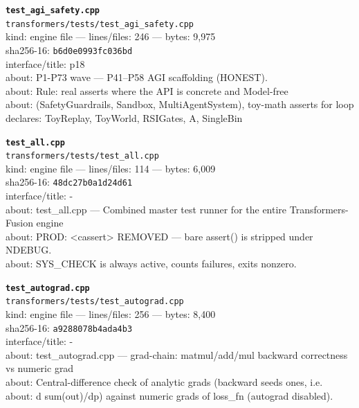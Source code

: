 \noindent\textbf{\texttt{test\_agi\_safety.cpp}}\\
\texttt{transformers/tests/test\_agi\_safety.cpp}\\
kind: engine file --- lines/files: 246 --- bytes: 9,975\\
sha256-16: \texttt{b6d0e0993fc036bd}\\
interface/title: p18\\
about: P1-P73 wave — P41–P58 AGI scaffolding (HONEST).\\
about: Rule: real asserts where the API is concrete and Model-free\\
about: (SafetyGuardrails, Sandbox, MultiAgentSystem), toy-math asserts for loop\\
declares: ToyReplay, ToyWorld, RSIGates, A, SingleBin\\
\vspace*{6.0pt}

\noindent\textbf{\texttt{test\_all.cpp}}\\
\texttt{transformers/tests/test\_all.cpp}\\
kind: engine file --- lines/files: 114 --- bytes: 6,009\\
sha256-16: \texttt{48dc27b0a1d24d61}\\
interface/title: -\\
about: test\_all.cpp — Combined master test runner for the entire Transformers-Fusion engine\\
about: PROD: <cassert> REMOVED — bare assert() is stripped under NDEBUG.\\
about: SYS\_CHECK is always active, counts failures, exits nonzero.\\
\vspace*{6.0pt}

\noindent\textbf{\texttt{test\_autograd.cpp}}\\
\texttt{transformers/tests/test\_autograd.cpp}\\
kind: engine file --- lines/files: 256 --- bytes: 8,400\\
sha256-16: \texttt{a9288078b4ada4b3}\\
interface/title: -\\
about: test\_autograd.cpp — grad-chain: matmul/add/mul backward correctness vs numeric grad\\
about: Central-difference check of analytic grads (backward seeds ones, i.e.\\
about: d sum(out)/dp) against numeric grads of loss\_fn (autograd disabled).\\
\vspace*{6.0pt}

